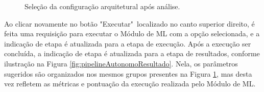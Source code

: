 \documentclass[Portugues,Final]{ic-tese-v3}
\begin{document}
\begin{figure}[H]
    \centering
    \caption{Seleção da configuração arquitetural após análise.}
    \label{fig:pipelineAutonomoSelecao}
\end{figure}

Ao clicar novamente no botão "Executar"~localizado no canto superior direito, é feita uma requisição para executar o Módulo de ML com a opção selecionada, e a indicação de etapa é atualizada para a etapa de execução. Após a execução ser concluída,  a indicação de etapa é atualizada para a etapa de resultados, conforme ilustração na Figura \ref{fig:pipelineAutonomoResultado}. Nela, os parâmetros sugeridos são organizados nos mesmos grupos presentes na Figura \ref{fig:pipelineAutonomoSelecao}, mas desta vez refletem as métricas e pontuação da execução realizada pelo Módulo de ML.
\end{document}
